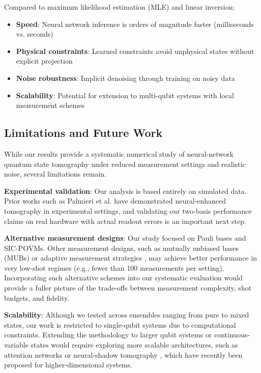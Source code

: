 \documentclass[conference]{IEEEtran}
\begin{document}
Compared to maximum likelihood estimation (MLE) and linear inversion:
\begin{itemize}
    \item \textbf{Speed}: Neural network inference is orders of magnitude faster (milliseconds vs. seconds)
    \item \textbf{Physical constraints}: Learned constraints avoid unphysical states without explicit projection
    \item \textbf{Noise robustness}: Implicit denoising through training on noisy data
    \item \textbf{Scalability}: Potential for extension to multi-qubit systems with local measurement schemes
\end{itemize}

\subsection{Limitations and Future Work}

While our results provide a systematic numerical study of neural-network quantum state tomography under reduced measurement settings and realistic noise, several limitations remain. 

\textbf{Experimental validation}: Our analysis is based entirely on simulated data. Prior works such as Palmieri et al. \cite{palmieri2020experimental} have demonstrated neural-enhanced tomography in experimental settings, and validating our two-basis performance claims on real hardware with actual readout errors is an important next step.

\textbf{Alternative measurement designs}: Our study focused on Pauli bases and SIC-POVMs. Other measurement designs, such as mutually unbiased bases (MUBs) or adaptive measurement strategies \cite{quek2018adaptive}, may achieve better performance in very low-shot regimes (e.g., fewer than 100 measurements per setting). Incorporating such alternative schemes into our systematic evaluation would provide a fuller picture of the trade-offs between measurement complexity, shot budgets, and fidelity.

\textbf{Scalability}: Although we tested across ensembles ranging from pure to mixed states, our work is restricted to single-qubit systems due to computational constraints. Extending the methodology to larger qubit systems or continuous-variable states would require exploring more scalable architectures, such as attention networks \cite{li2023attention} or neural-shadow tomography \cite{huang2022neural}, which have recently been proposed for higher-dimensional systems.
\end{document}
